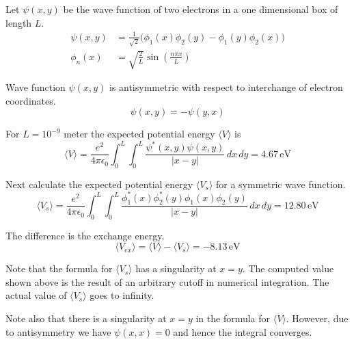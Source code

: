 \documentclass[12pt]{article}
\begin{document}
\noindent
Let $\psi(x,y)$ be the wave function of two electrons in a one dimensional box of length $L$.
\begin{align*}
\psi(x,y)&=\frac{1}{\sqrt{2}}
\big(\phi_1(x)\phi_2(y)-\phi_1(y)\phi_2(x)\big)
\\[2ex]
\phi_n(x)&=\sqrt{\frac{2}{L}}\sin\left(\frac{n\pi x}{L}\right)
\end{align*}

\noindent
Wave function $\psi(x,y)$ is antisymmetric with respect to interchange of electron coordinates.
\begin{equation*}
\psi(x,y)=-\psi(y,x)
\end{equation*}

\noindent
For $L=10^{-9}$ meter the expected potential energy $\langle V\rangle$ is
\begin{equation*}
\langle V\rangle=\frac{e^2}{4\pi\epsilon_0}\int_0^L\int_0^L\frac{\psi^*(x,y)\psi(x,y)}{|x-y|}\,dx\,dy
=4.67\,\text{eV}
\end{equation*}

\noindent
Next calculate the expected potential energy $\langle V_s\rangle$ for a symmetric wave function.
\begin{equation*}
\langle V_s\rangle=\frac{e^2}{4\pi\epsilon_0}
\int_0^L\int_0^L\frac{\phi_1^*(x)\phi_2^*(y)\phi_1(x)\phi_2(y)}{|x-y|}\,dx\,dy
=12.80\,\text{eV}
\end{equation*}

\noindent
The difference is the exchange energy.
\begin{equation*}
\langle V_{ex}\rangle=\langle V\rangle-\langle V_s\rangle=-8.13\,\text{eV}
\end{equation*}

\noindent
Note that the formula for $\langle V_s\rangle$ has a singularity at $x=y$.
The computed value shown above is the result of an arbitrary cutoff in numerical integration.
The actual value of $\langle V_s\rangle$ goes to infinity.

\bigskip
\noindent
Note also that there is a singularity at $x=y$ in the formula for $\langle V\rangle$.
However, due to antisymmetry we have $\psi(x,x)=0$ and hence the integral converges.
\end{document}
